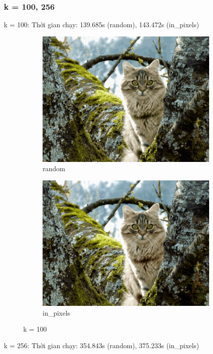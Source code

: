 \documentclass{article}
\begin{document}
\subsubsection{k = 100, 256}
k = 100: Thời gian chạy: 139.685s (random), 143.472s (in\_pixels) \\ 
\begin{figure}[ht!]
  \begin{subfigure}{.5\textwidth}
    \centering
    \includegraphics[width=.8\linewidth]{image/random_100.png}
    \caption{random}
    \label{fig:sfig7}
  \end{subfigure}%
  \begin{subfigure}{.5\textwidth}
    \centering
    \includegraphics[width=.8\linewidth]{image/in_100.png}
    \caption{in\_pixels}
    \label{fig:sfig8}
  \end{subfigure}
  \caption{k = 100}
  \label{fig:fig3}
\end{figure}
k = 256: Thời gian chạy: 354.843s (random), 375.233s (in\_pixels)
\end{document}
